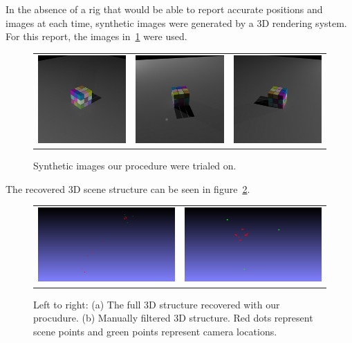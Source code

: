 \documentclass[preprint,acmtog]{acmart}
\begin{document}
In the absence of a rig that would be able to report accurate positions and
images at each time, synthetic images were generated by a 3D rendering
system. For this report, the images in~\ref{fig:camgraph} were used.
%
\begin{figure}
  \label{fig:camgraph}
  \begin{tabular}{ccc}
    \includegraphics[width=0.3\linewidth]{cam-000} &
    \includegraphics[width=0.3\linewidth]{cam-001} &
    \includegraphics[width=0.3\linewidth]{cam-002}
  \end{tabular}
  \caption{Synthetic images our procedure were trialed on.}
\end{figure}
%
The recovered 3D scene structure can be seen in figure~\ref{fig:sfm}.
%
\begin{figure}
  \label{fig:sfm}
  \begin{tabular}{cc}
    \includegraphics[width=0.5\linewidth]{sfm_all} &
    \includegraphics[width=0.5\linewidth]{sfm_filtered}
  \end{tabular}
  \caption{Left to right: (a) The full 3D structure recovered with our
    procudure. (b) Manually filtered 3D structure. Red dots represent scene
    points and green points represent camera locations.}
\end{figure}
\end{document}
